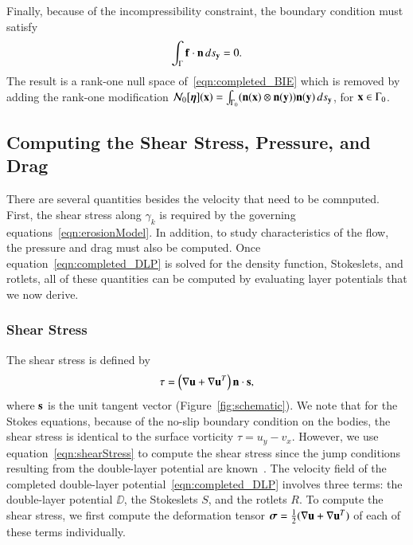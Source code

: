 \documentclass[preprint, 10pt]{elsarticle}
\begin{document}
Finally, because of the incompressibility constraint, the boundary
condition must satisfy 
\begin{align*}
  \int_{\Gamma} \ff \cdot \nn \, ds_\yy = 0.
\end{align*}
The result is a rank-one null space of~\eqref{eqn:completed_BIE} which
is removed by adding the rank-one modification $\NN_0[\eeta](\xx) =
\int_{\Gamma_0} (\nn(\xx) \otimes \nn(\yy))\nn(\yy) \, ds_\yy$, for $\xx
\in \Gamma_0$.




\subsection{Computing the Shear Stress, Pressure, and Drag} 
\label{sec:qois}
There are several quantities besides the velocity that need to be
comnputed.  First, the shear stress along $\gamma_k$ is required by the
governing equations~\eqref{eqn:erosionModel}.  In addition, to study
characteristics of the flow, the pressure and drag must also be
computed.  Once equation~\eqref{eqn:completed_DLP} is solved for the
density function, Stokeslets, and rotlets, all of these quantities can
be computed by evaluating layer potentials that we now derive.

\subsubsection{Shear Stress}
The shear stress is defined by
\begin{align}
  \tau = \left(\nabla \uu + \nabla \uu^T \right)\nn \cdot \ss,
  \label{eqn:shearStress}
\end{align}
where $\ss$ is the unit tangent vector (Figure~\ref{fig:schematic}).  We
note that for the Stokes equations, because of the no-slip boundary
condition on the bodies, the shear stress is identical to the surface
vorticity $\tau = u_y - v_x$.  However, we use
equation~\eqref{eqn:shearStress} to compute the shear stress since the
jump conditions resulting from the double-layer potential are
known~\cite{qua-bir2014a}.  The velocity field of the completed
double-layer potential~\eqref{eqn:completed_DLP} involves three terms:
the double-layer potential $\DD$, the Stokeslets $S$, and the rotlets
$R$.  To compute the shear stress, we first compute the deformation
tensor $\ssigma = \frac{1}{2}(\nabla\uu + \nabla\uu^T)$ of each of these
terms individually.
\end{document}
